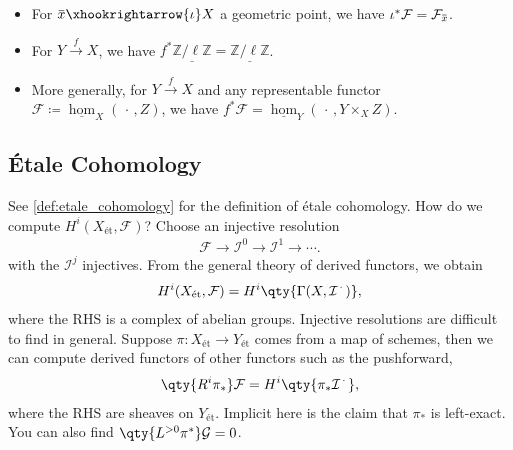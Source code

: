 \begin{example}[?]

\envlist

\begin{itemize}
\item
  For
  \(\mkern 1.5mu\overline{\mkern-1.5mux\mkern-1.5mu}\mkern 1.5mu\xhookrightarrow{\iota} X\)
  a geometric point, we have
  \(\iota^* \mathcal{F}= \mathcal{F}_{\mkern 1.5mu\overline{\mkern-1.5mux\mkern-1.5mu}\mkern 1.5mu}\).
\item
  For \(Y\xrightarrow{f} X\), we have
  \(f^* \underline{\mathbb{Z}/\ell\mathbb{Z}} = \underline{\mathbb{Z}/\ell\mathbb{Z}}\).
\item
  More generally, for \(Y\xrightarrow{f} X\) and any representable
  functor \(\mathcal{F} \coloneqq\underline{\hom}_X({\,\cdot\,}, Z)\),
  we have
  \(f^* \mathcal{F} = \underline{\hom}_Y({\,\cdot\,}, Y\times_X Z)\).
\end{itemize}

\end{example}

\hypertarget{uxe9tale-cohomology-1}{%
\subsection{Étale Cohomology}\label{uxe9tale-cohomology-1}}

See \cref{def:etale_cohomology} for the definition of étale cohomology.
How do we compute \(H^i(X_{\text{ét}}, \mathcal{F})\)? Choose an
injective resolution
\begin{align*}  
\mathcal{F}\to \mathcal{I}^0 \to \mathcal{I}^1 \to \cdots
.\end{align*}
with the \(\mathcal{I}^j\) injectives. From the general theory of
derived functors, we obtain
\begin{align*}  
H^i(X_\text{ét}, \mathcal{F}) = H^i\qty{\Gamma(X, \mathcal{I}^{\,\cdot\,})}
,\end{align*}
where the RHS is a complex of abelian groups. Injective resolutions are
difficult to find in general. Suppose \(\pi:X_\text{ét}\to Y_\text{ét}\)
comes from a map of schemes, then we can compute derived functors of
other functors such as the pushforward,
\begin{align*}  
\qty{R^i \pi_*} \mathcal{F} = H^i\qty{ \pi_* \mathcal{I}^{\,\cdot\,}}
,\end{align*}
where the RHS are sheaves on \(Y_\text{ét}\). Implicit here is the claim
that \(\pi_*\) is left-exact. You can also find
\(\qty{L^{>0} \pi^*} \mathcal{G} = 0\).

